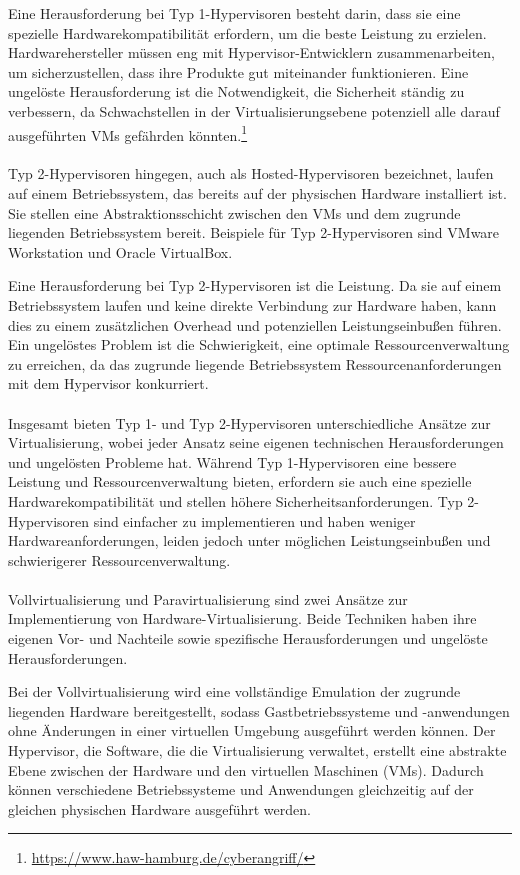 Eine Herausforderung bei Typ 1-Hypervisoren besteht darin, dass sie eine spezielle Hardwarekompatibilität erfordern, um die beste Leistung zu erzielen. Hardwarehersteller müssen eng mit Hypervisor-Entwicklern zusammenarbeiten, um sicherzustellen, dass ihre Produkte gut miteinander funktionieren. Eine ungelöste Herausforderung ist die Notwendigkeit, die Sicherheit ständig zu verbessern, da Schwachstellen in der Virtualisierungsebene potenziell alle darauf ausgeführten VMs gefährden könnten.\footnote{\url{https://www.haw-hamburg.de/cyberangriff/}}
\\\\
Typ 2-Hypervisoren hingegen, auch als Hosted-Hypervisoren bezeichnet, laufen auf einem Betriebssystem, das bereits auf der physischen Hardware installiert ist. Sie stellen eine Abstraktionsschicht zwischen den VMs und dem zugrunde liegenden Betriebssystem bereit. Beispiele für Typ 2-Hypervisoren sind VMware Workstation und Oracle VirtualBox.

Eine Herausforderung bei Typ 2-Hypervisoren ist die Leistung. Da sie auf einem Betriebssystem laufen und keine direkte Verbindung zur Hardware haben, kann dies zu einem zusätzlichen Overhead und potenziellen Leistungseinbußen führen. Ein ungelöstes Problem ist die Schwierigkeit, eine optimale Ressourcenverwaltung zu erreichen, da das zugrunde liegende Betriebssystem Ressourcenanforderungen mit dem Hypervisor konkurriert.
\\\\
Insgesamt bieten Typ 1- und Typ 2-Hypervisoren unterschiedliche Ansätze zur Virtualisierung, wobei jeder Ansatz seine eigenen technischen Herausforderungen und ungelösten Probleme hat. Während Typ 1-Hypervisoren eine bessere Leistung und Ressourcenverwaltung bieten, erfordern sie auch eine spezielle Hardwarekompatibilität und stellen höhere Sicherheitsanforderungen. Typ 2-Hypervisoren sind einfacher zu implementieren und haben weniger Hardwareanforderungen, leiden jedoch unter möglichen Leistungseinbußen und schwierigerer Ressourcenverwaltung.
\\\\
Vollvirtualisierung und Paravirtualisierung sind zwei Ansätze zur Implementierung von Hardware-Virtualisierung. Beide Techniken haben ihre eigenen Vor- und Nachteile sowie spezifische Herausforderungen und ungelöste Herausforderungen.

Bei der Vollvirtualisierung wird eine vollständige Emulation der zugrunde liegenden Hardware bereitgestellt, sodass Gastbetriebssysteme und -anwendungen ohne Änderungen in einer virtuellen Umgebung ausgeführt werden können. Der Hypervisor, die Software, die die Virtualisierung verwaltet, erstellt eine abstrakte Ebene zwischen der Hardware und den virtuellen Maschinen (VMs). Dadurch können verschiedene Betriebssysteme und Anwendungen gleichzeitig auf der gleichen physischen Hardware ausgeführt werden.

